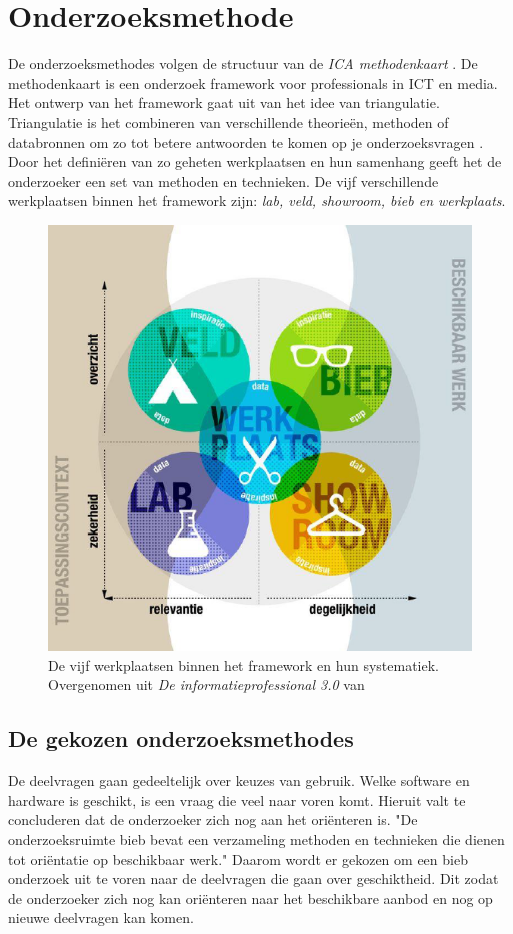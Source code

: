 \documentclass[a4paper, 11pt, oneside]{report}
\begin{document}
\section{Onderzoeksmethode}
De onderzoeksmethodes volgen de structuur van de \textit{ICA methodenkaart} \cite{MethodenKaart}.
De methodenkaart is een onderzoek framework voor professionals in ICT en media.
Het ontwerp van het framework gaat uit van het idee van triangulatie.
Triangulatie is het combineren van verschillende theorieën, methoden of databronnen om zo tot betere antwoorden te komen op je onderzoeksvragen \cite{ICAoates}. 
Door het definiëren van zo geheten werkplaatsen en hun samenhang geeft het de onderzoeker een set van methoden en technieken. 
De vijf verschillende werkplaatsen binnen het framework zijn: \textit{lab, veld, showroom, bieb en werkplaats}.

\begin{figure}[H]
	\begin{center}\includegraphics[width=0.5\linewidth]{Methodenkaart}\end{center}
	\caption{De vijf werkplaatsen binnen het framework en hun systematiek. Overgenomen uit \textit{De informatieprofessional 3.0}  van \protect{}  }
	\label{fig:methodenkaart}
\end{figure}

\subsection{De gekozen onderzoeksmethodes}

De deelvragen gaan gedeeltelijk over keuzes van gebruik. 
Welke software en hardware is geschikt, is een vraag die veel naar voren komt.
Hieruit valt te concluderen dat de onderzoeker zich nog aan het oriënteren is.
"De onderzoeksruimte bieb bevat een verzameling methoden en technieken die dienen tot oriëntatie op beschikbaar werk."\cite{MethodenKaart}
Daarom wordt er gekozen om een bieb onderzoek uit te voren naar de deelvragen die gaan over geschiktheid.
Dit zodat de onderzoeker zich nog kan oriënteren naar het beschikbare aanbod en nog op nieuwe deelvragen kan komen. 
\end{document}
